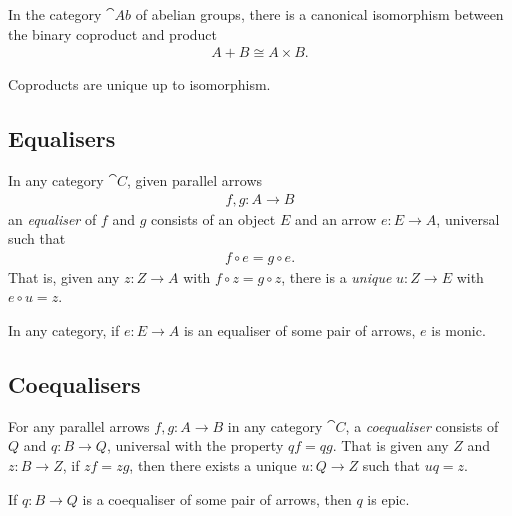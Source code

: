 \documentclass{article}
\begin{document}
\begin{proposition}[Awodey 3.11]
	In the category $\cat{Ab}$ of abelian groups, there is a canonical isomorphism between the binary
	coproduct and product
	\begin{align*}
		A + B \cong A \times B.
	\end{align*}
\end{proposition}

\begin{proposition}[Awodey 3.12]
	Coproducts are unique up to isomorphism.
\end{proposition}

\subsection{Equalisers}

\begin{definition}
	In any category $\cat C$, given parallel arrows
	\begin{align*}
		f,g: A\to B
	\end{align*}
	an \emph{equaliser} of $f$ and $g$ consists of an object $E$ and an arrow $e:E\to A$,
	universal such that
	\begin{align*}
		f \circ e = g \circ e.
	\end{align*}
	That is, given any $z:Z\to A$ with $f\circ z=g\circ z$, there is a \emph{unique}
	$u:Z\to E$ with $e\circ u = z$.
\end{definition}

\begin{proposition}[Awodey 3.16]
	In any category, if $e:E\to A$ is an equaliser of some pair of arrows, $e$ is monic.
\end{proposition}

\subsection{Coequalisers}

\begin{definition}
	For any parallel arrows $f,g:A\to B$ in any category $\cat C$, a \emph{coequaliser}
	consists of $Q$ and $q:B\to Q$, universal with the property $qf=qg$. That is given
	any $Z$ and $z:B\to Z$, if $zf=zg$, then there exists a unique $u:Q\to Z$ such that
	$uq=z$.
\end{definition}

\begin{proposition}[Awodey 3.19]
	If $q:B\to Q$ is a coequaliser of some pair of arrows, then $q$ is epic.
\end{proposition}
\end{document}
